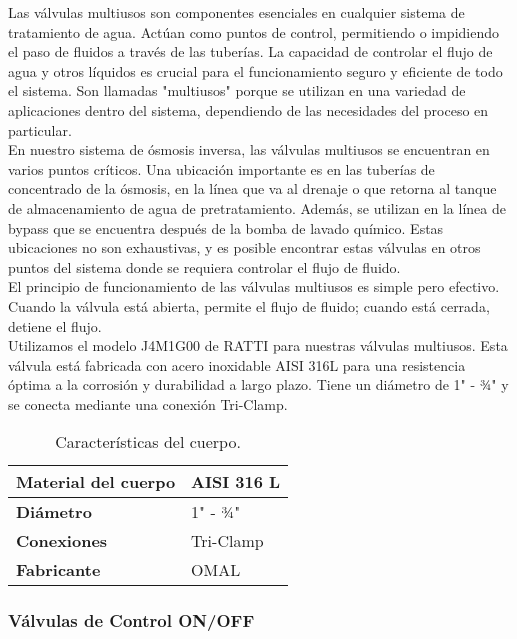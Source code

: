 Las válvulas multiusos son componentes esenciales en cualquier sistema de tratamiento de agua. Actúan como puntos de control, permitiendo o impidiendo el paso de fluidos a través de las tuberías. La capacidad de controlar el flujo de agua y otros líquidos es crucial para el funcionamiento seguro y eficiente de todo el sistema. Son llamadas "multiusos" porque se utilizan en una variedad de aplicaciones dentro del sistema, dependiendo de las necesidades del proceso en particular.\\

En nuestro sistema de ósmosis inversa, las válvulas multiusos se encuentran en varios puntos críticos. Una ubicación importante es en las tuberías de concentrado de la ósmosis, en la línea que va al drenaje o que retorna al tanque de almacenamiento de agua de pretratamiento. Además, se utilizan en la línea de bypass que se encuentra después de la bomba de lavado químico. Estas ubicaciones no son exhaustivas, y es posible encontrar estas válvulas en otros puntos del sistema donde se requiera controlar el flujo de fluido.\\

El principio de funcionamiento de las válvulas multiusos es simple pero efectivo. Cuando la válvula está abierta, permite el flujo de fluido; cuando está cerrada, detiene el flujo.\\

Utilizamos el modelo J4M1G00 de RATTI para nuestras válvulas multiusos. Esta válvula está fabricada con acero inoxidable AISI 316L para una resistencia óptima a la corrosión y durabilidad a largo plazo. Tiene un diámetro de 1" - ¾" y se conecta mediante una conexión Tri-Clamp.\\

\begin{table}[H]
    \centering
    \caption{Características del cuerpo.}
    \label{table:valvula_multiusos}
    \begin{tabular}{| L{5cm} | L{5cm} |}
        \hline
        \textbf{Material del cuerpo} & AISI 316 L \\
        \hline
        \textbf{Diámetro} & 1" - ¾" \\
        \hline
        \textbf{Conexiones} & Tri-Clamp \\
        \hline
        \textbf{Fabricante} & OMAL \\
        \hline
    \end{tabular}
\end{table}

\subsubsection{Válvulas de Control ON/OFF}

